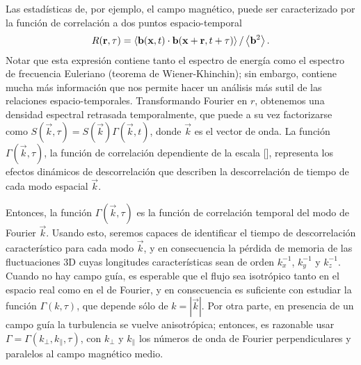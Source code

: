 Las estadísticas de, por ejemplo, el campo magnético, puede ser
caracterizado por la función de correlación a dos puntos
espacio-temporal
\begin{equation}
R(\vec{r},\tau) = \left\langle \vec{b}( \vec{x},t) \cdot
  \vec{b}( \vec{x} + \vec{r},t+\tau) \right\rangle / \left\langle {\bf
    b}^2 \right\rangle.
\label{eq3:Rbij}
\end{equation}
Notar que esta expresión contiene tanto el espectro de energía como el
espectro de frecuencia Euleriano (teorema de Wiener-Khinchin); sin
embargo, contiene mucha más información que nos permite hacer un
análisis más sutil de las relaciones espacio-temporales.
Transformando Fourier en $r$, obtenemos una densidad espectral
retrasada temporalmente, que puede a su vez factorizarse como
$S(\vec{k},\tau) = S(\vec{k})\Gamma(\vec{k},t)$, donde $\vec{k}$ es el
vector de onda. La función $\Gamma(\vec{k},\tau)$, la función de
correlación dependiente de la escala [\cite{heisenberg_zur_1948,
comte-bellot_simple_1971, orszag_numerical_1972}], representa los
efectos dinámicos de descorrelación que describen la descorrelación de
tiempo de cada modo espacial $\vec{k}$.

Entonces, la función $\Gamma(\vec{k},\tau)$ es la función de
correlación temporal del modo de Fourier $\vec{k}$. Usando esto,
seremos capaces de identificar el tiempo de descorrelación
característico para cada modo $\vec{k}$, y en consecuencia la pérdida
de memoria de las fluctuaciones 3D cuyas longitudes características
sean de orden $k_x^{-1}$, $k_y^{-1}$ y $k_z^{-1}$. Cuando no hay campo
guía, es esperable que el flujo sea isotrópico tanto en el espacio
real como en el de Fourier, y en consecuencia es suficiente con
estudiar la función $\Gamma(k,\tau)$, que depende sólo de
$k=|\vec{k}|$. Por otra parte, en presencia de un campo guía la
turbulencia se vuelve anisotrópica; entonces, es razonable usar
$\Gamma = \Gamma(k_\perp,k_\parallel,\tau)$, con $k_\perp$ y
$k_\parallel$ los números de onda de Fourier perpendiculares y
paralelos al campo magnético medio.


